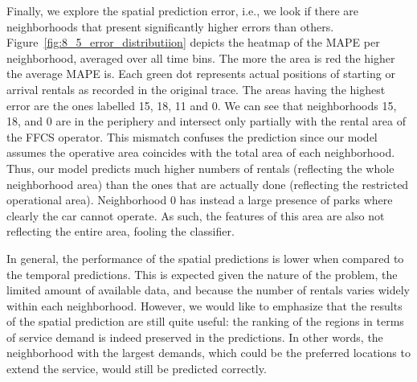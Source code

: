 Finally, we explore the spatial prediction error, i.e., we look if there are neighborhoods that present significantly higher errors than others.
Figure~\ref{fig:8_5_error_distributiion} depicts the heatmap of the MAPE per neighborhood, averaged over all time bins. The more the area is red the higher the average MAPE is. Each green dot represents actual positions of starting or arrival rentals as recorded in the original trace.
The areas having the highest error are the ones labelled 15, 18, 11 and 0. We can see that neighborhoods 15, 18, and 0 are in the periphery and intersect only partially with the rental area of the FFCS operator. This mismatch confuses the prediction since our model assumes the operative area coincides with the total area of each neighborhood. Thus, our model predicts much higher numbers of rentals (reflecting the whole neighborhood area) than the ones that are actually done (reflecting the restricted operational area). Neighborhood 0 has instead a large presence of parks where clearly the car cannot operate. As such, the features of this area are also not reflecting the entire area, fooling the classifier.

In general, the performance of the spatial predictions is lower when compared to the temporal predictions. This is expected given the nature of the problem, the limited amount of available data, and because the number of rentals varies widely within each neighborhood. However, we would like to emphasize that the results of the spatial prediction are still quite useful: the ranking of the regions in terms of service demand is indeed preserved in the predictions. In other words, the neighborhood with the largest demands, which could be the preferred locations to extend the service, would still be predicted correctly.



